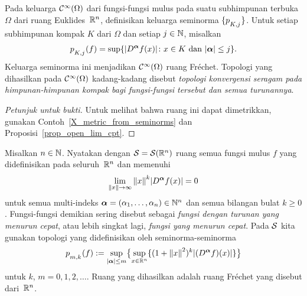 \begin{exam}\label{X_smooth_fcns_Frechet} Pada keluarga $\mathcal{C}^\infty(\Omega)$ dari fungsi-fungsi mulus pada suatu subhimpunan terbuka $\Omega$ dari
ruang Euklides~$\mathbb{R}^n$, definisikan keluarga seminorma $\{p_{{}_{\scriptstyle{K,j}}}\}$. Untuk setiap subhimpunan kompak $K$ dari $\Omega$ dan setiap
$j \in \mathbb{N}$, misalkan
   \[ p_{{}_{\scriptstyle{K,j}}}(f) = \sup\{\lvert D^{\boldsymbol{\alpha}}f(x)\rvert\colon x \in K \text{ dan } \lvert\boldsymbol{\alpha}\rvert \le j\}. \]
Keluarga seminorma ini menjadikan $\mathcal{C}^\infty(\Omega)$ ruang Fr\'echet. Topologi yang dihasilkan pada $\mathcal{C}^\infty(\Omega)$
kadang-kadang disebut
\emph{topologi konvergensi seragam pada himpunan-himpunan kompak bagi fungsi-fungsi tersebut dan semua turunannya}.
\end{exam}

\begin{proof}[\emph{Petunjuk untuk bukti}] Untuk melihat bahwa ruang ini dapat dimetrikkan, gunakan Contoh~\ref{X_metric_from_seminorms} dan
Proposisi~\ref{prop_open_lim_cpt}.  \ns
\end{proof}

\begin{exam}\label{Schwartz_space} Misalkan $n \in \mathbb{N}$. Nyatakan dengan $\mathcal{S} = \mathcal{S}(\mathbb{R}^n)$
ruang semua fungsi mulus $f$ yang didefinisikan pada seluruh~$\mathbb{R}^n$ dan memenuhi
   \[ \lim_{\lVert x\rVert \rightarrow \infty}{\lVert x\rVert}^k \lvert D^{\boldsymbol{\alpha}}f(x)\rvert = 0 \]
untuk semua multi-indeks $\boldsymbol{\alpha} = (\alpha_1,\dots,\alpha_n) \in \mathbb{N}^n$ dan semua bilangan bulat $k \ge 0$. Fungsi-fungsi demikian sering disebut
sebagai
\emph{fungsi dengan turunan yang menurun cepat}, atau lebih singkat lagi, \emph{fungsi yang menurun cepat}. Pada $\mathcal{S}$ kita gunakan
topologi yang didefinisikan oleh seminorma-seminorma
   \[ p_{{}_{\scriptstyle{m,k}}}(f) := \sup_{\lvert\boldsymbol{\alpha}\rvert \le m}\bigl\{\sup_{x \in \mathbb{R}^n} \{(1 + {\lVert x\rVert}^2)^k \lvert(D^{\boldsymbol{\alpha}}f)(x)\rvert\}\bigr\} \]
untuk $k$, $m = 0,1,2,\dots$. Ruang yang dihasilkan adalah ruang Fr\'echet yang disebut
 dari~$\mathbb{R}^n$.
\end{exam}

